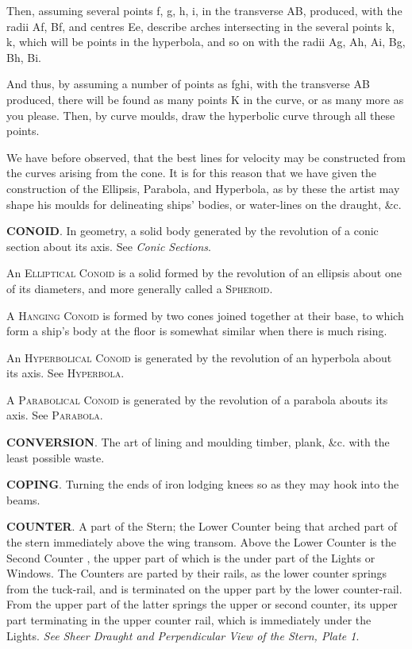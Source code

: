 Then, assuming several points f, g, h, i, in the transverse AB, produced, with the radii Af, Bf, and centres Ee, describe arches intersecting in the several points k, k, which will be points in the hyperbola, and so on with the radii Ag, Ah, Ai, Bg, Bh, Bi. 

And thus, by assuming a number of points as fghi, with the transverse AB produced, there will be found as many points K in the curve, or as many more as you please. Then, by curve moulds, draw the hyperbolic curve through all these points. 

We have before observed, that the best lines for velocity may be constructed from the curves arising from the cone. It is for this reason that we have given the construction of the Ellipsis, Parabola, and Hyperbola, as by these the artist may shape his moulds for delineating ships' bodies, or water-lines on the draught, \&c. 

\textbf{CONOID}. In geometry, a solid body generated by the revolution of a conic section about its axis. See \textit{Conic Sections}. 

An \textsc{Elliptical Conoid} is a solid formed by the revolution of an ellipsis about one of its diameters, and more generally called a \textsc{Spheroid}. 

A \textsc{Hanging Conoid} is formed by two cones joined together at their base, to which form a ship's body at the floor is somewhat similar when there is much rising. 

An \textsc{Hyperbolical Conoid} is generated by the revolution of an hyperbola about its axis. See \textsc{Hyperbola}. 

A \textsc{Parabolical Conoid} is generated by the revolution of a parabola abouts its axis. See \textsc{Parabola}. 

\textbf{CONVERSION}. The art of lining and moulding timber, plank, \&c. with the least possible waste. 

\textbf{COPING}. Turning the ends of iron lodging knees so as they may hook into the beams. 

\textbf{COUNTER}. A part of the Stern; the Lower Counter being that arched part of the stern immediately above the wing transom. Above the Lower Counter is the Second Counter , the upper part of which is the under part of the Lights or Windows. The Counters are parted by their rails, as the lower counter springs from the tuck-rail, and is terminated on the upper part by the lower counter-rail. From the upper part of the latter springs the upper or second counter, its upper part terminating in the upper counter rail, which is immediately under the Lights. \textit{See Sheer Draught and Perpendicular View of the Stern, Plate 1}. 

